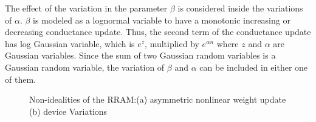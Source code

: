 \documentclass[english]{article}
\begin{document}
The effect of the variation in the parameter $\beta$ is considered inside the variations of $\alpha$. $\beta$ is modeled as a lognormal variable to have a monotonic increasing or decreasing conductance update.
Thus, the second term of the conductance update has log Gaussian variable, which is $e^z$, multiplied by $e^{\alpha n}$ where $z$ and $\alpha$ are Gaussian variables.
Since the sum of two Gaussian random variables is a Gaussian random variable, the variation of $\beta$ and $\alpha$ can be included in either one of them. 
%
\begin{figure}[!t]
\centering
\vspace{-0.15in}
\hfil
{}
\vspace{-0.05in}
\caption{Non-idealities of the RRAM:(a) asymmetric nonlinear weight update (b) device Variations}
\label{ConductanceVsPulsesFigure}
\vspace{-0.05in}
\end{figure}
%
\end{document}

